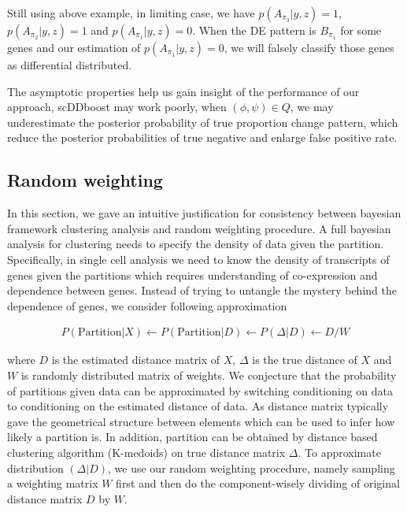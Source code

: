 \documentclass[aoas,preprint]{imsart}
\begin{document}
Still using above example, in limiting case, we have $p(A_{\pi_3} | y,z) = 1$, $p(A_{\pi_2} | y,z) = 1$ and $p(A_{\pi_1}| y,z) = 0$. When the DE pattern is $B_{\pi_1}$ for some genes and our estimation of $p(A_{\pi_1}| y,z) = 0$, we will falsely classify those genes as differential distributed.

The asymptotic properties help us gain insight of the performance of our approach,
scDDboost may work poorly, when $(\phi, \psi)\in Q$, we may underestimate the posterior probability of true proportion change pattern, which reduce the posterior probabilities of true negative and enlarge false positive rate.\\

\subsection{Random weighting}
In this section, we gave an intuitive justification for consistency between bayesian framework clustering analysis and random weighting procedure. A full bayesian analysis for clustering needs to specify the density of data given the partition. Specifically, in single cell analysis we need to know the density of transcripts of genes given the partitions which requires understanding of co-expression and dependence between genes. Instead of trying to untangle the mystery behind the dependence of genes, we consider following approximation 

\begin{eqnarray*}
P(\text{Partition} | X) \leftarrow P(\text{Partition} | D) \leftarrow P(\Delta | D) \leftarrow D / W
\end{eqnarray*} 

where $D$ is the estimated distance matrix of $X$, $\Delta$ is the true distance of $X$ and $W$ is randomly distributed matrix of weights. We conjecture that the probability of partitions given data can be approximated by switching conditioning on data to conditioning on the estimated distance of data. As distance matrix typically gave the geometrical structure between elements which can be used to infer how likely a partition is.  In addition, partition can be obtained by  distance based clustering algorithm (K-medoids) on true distance matrix $\Delta$.  To approximate distribution $(\Delta | D)$, we use our random weighting procedure, namely sampling a weighting matrix $W$ first and then do the component-wisely dividing of original distance matrix $D$ by $W$.
\end{document}
